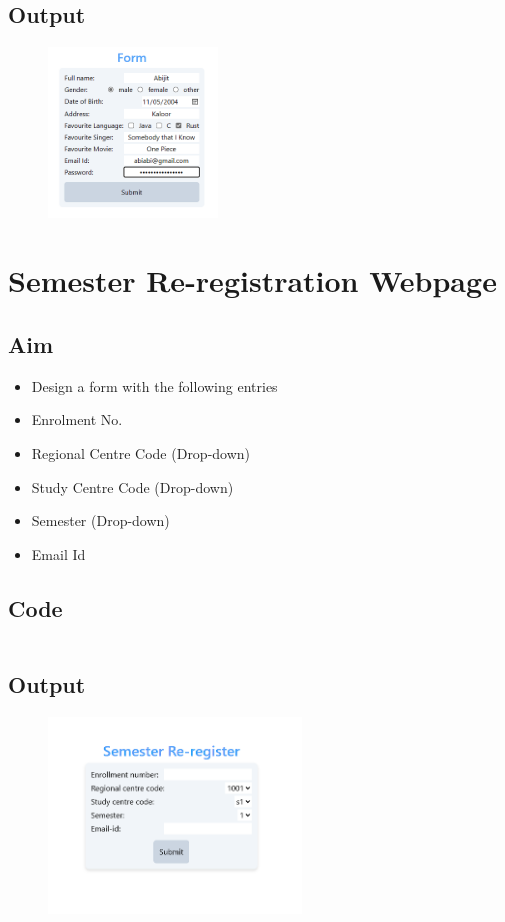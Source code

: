 \documentclass{article}
\begin{document}
\subsection{Output}
\begin{figure}[h!]
	\centering
	\includegraphics[width=0.4\textwidth]{./Assets/p04.png}
\end{figure}
\newpage

\section{Semester Re-registration Webpage}
\subsection{Aim}
\begin{itemize}
	\item Design a form with the following entries
	\item Enrolment No.
	\item Regional Centre Code (Drop-down)
	\item Study Centre Code (Drop-down)
	\item Semester (Drop-down)
	\item Email Id
\end{itemize}

\subsection{Code}
\inputminted[frame=lines, breaklines, breakanywhere, numberblanklines=false]{html}{./prog_5/index.html}

\subsection{Output}
\begin{figure}[h!]
	\centering
	\includegraphics[width=0.6\textwidth]{./Assets/p05.png}
\end{figure}
\newpage
\end{document}
